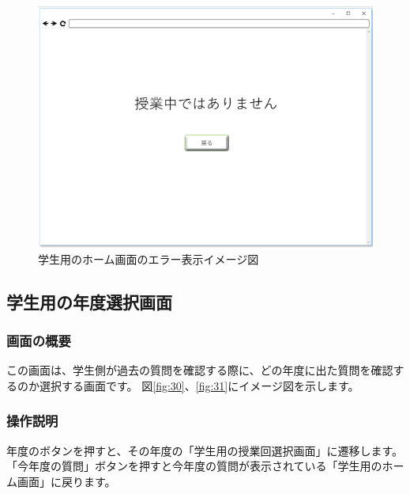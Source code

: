 \begin{figure}[htbp]
  \begin{center}
    \includegraphics[width=0.5\linewidth,clip]{./img/00.png}
    \caption{学生用のホーム画面のエラー表示イメージ図}\label{fig:00}
  \end{center}
\end{figure}

\newpage

\subsection{学生用の年度選択画面}
\subsubsection{画面の概要}
この画面は、学生側が過去の質問を確認する際に、どの年度に出た質問を確認するのか選択する画面です。
図\ref{fig:30}、\ref{fig:31}にイメージ図を示します。

\subsubsection{操作説明}
年度のボタンを押すと、その年度の「学生用の授業回選択画面」に遷移します。
「今年度の質問」ボタンを押すと今年度の質問が表示されている「学生用のホーム画面」に戻ります。



